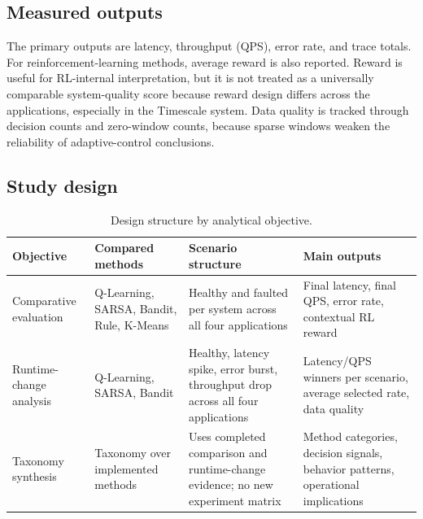 \documentclass[10pt,twocolumn]{article}
\begin{document}
\subsection{Measured outputs}
The primary outputs are latency, throughput (QPS), error rate, and trace totals. For reinforcement-learning methods, average reward is also reported. Reward is useful for RL-internal interpretation, but it is not treated as a universally comparable system-quality score because reward design differs across the applications, especially in the Timescale system. Data quality is tracked through decision counts and zero-window counts, because sparse windows weaken the reliability of adaptive-control conclusions.

\subsection{Study design}
\begin{table}[t]
\centering
\small
\caption{Design structure by analytical objective.}
\begin{tabularx}{\textwidth}{p{2.4cm}p{3.4cm}p{2.8cm}X}
\toprule
Objective & Compared methods & Scenario structure & Main outputs \\
\midrule
Comparative evaluation & Q-Learning, SARSA, Bandit, Rule, K-Means & Healthy and faulted per system across all four applications & Final latency, final QPS, error rate, contextual RL reward \\
Runtime-change analysis & Q-Learning, SARSA, Bandit & Healthy, latency spike, error burst, throughput drop across all four applications & Latency/QPS winners per scenario, average selected rate, data quality \\
Taxonomy synthesis & Taxonomy over implemented methods & Uses completed comparison and runtime-change evidence; no new experiment matrix & Method categories, decision signals, behavior patterns, operational implications \\
\bottomrule
\end{tabularx}
\end{table}
\end{document}
